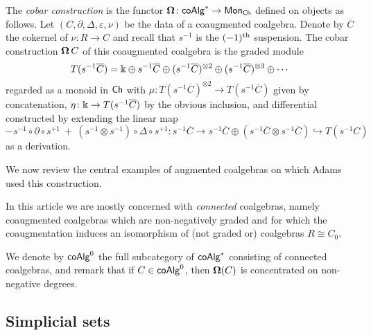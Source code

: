 The \textit{cobar construction} is the functor $\operatorname{\mathbf{\Omega}} \colon \mathsf{coAlg}^* \to \mathsf{Mon}_{\mathsf{Ch}}$ defined on objects as follows.
Let $(C, \partial, \Delta, \varepsilon, \nu)$ be the data of a coaugmented coalgebra.
Denote by $\overline{C}$ the cokernel of $\nu \colon R \to C$ and recall that $s^{-1}$ is the $(-1)^\mathrm{th}$ suspension.
The cobar construction $\operatorname{\mathbf{\Omega}} C$ of this coaugmented coalgebra is the graded module
\begin{equation*}
T(s^{-1} \overline{C}) = \Bbbk \oplus s^{-1}\overline{C} \oplus (s^{-1}\overline{C})^{\otimes 2} \oplus (s^{-1}\overline{C})^{\otimes 3} \oplus \cdots
\end{equation*}
regarded as a monoid in $\mathsf{Ch}$ with $\mu \colon T(s^{-1} \overline{C})^{\otimes 2} \to T(s^{-1} \overline{C})$ given by concatenation, $\eta \colon \Bbbk \to T(s^{-1} \overline{C})$ by the obvious inclusion, and differential constructed by extending the linear map
\begin{equation*}
- s^{-1} \circ \partial \circ s^{+1} \ + \ (s^{-1} \otimes s^{-1}) \circ \Delta \circ s^{+1} \colon
s^{-1} \overline{C} \to s^{-1}\overline{C} \oplus (s^{-1}\overline{C} \otimes s^{-1}\overline{C}) \hookrightarrow T(s^{-1}C)
\end{equation*}
as a derivation.

We now review the central examples of augmented coalgebras on which Adams used this construction.

In this article we are mostly concerned with \textit{connected} coalgebras, namely coaugmented coalgebras which are non-negatively graded and for which the coaugmentation induces an isomorphism of (not graded or) coalgebras $R \cong C_0$.


We denote by $\mathsf{coAlg}^0$ the full subcategory of $\mathsf{coAlg}^*$ consisting of connected coalgebras, and remark that if $C \in \mathsf{coAlg}^0$, then $ \operatorname{\mathbf{\Omega}}(C)$ is concentrated on non-negative degrees.


\subsection{Simplicial sets}

